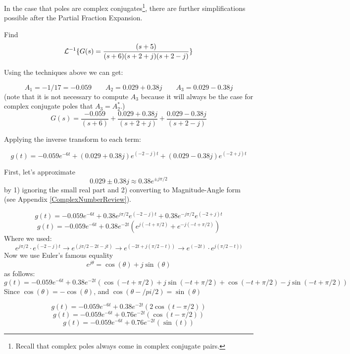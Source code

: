 In the case that poles are complex conjugates\footnote{Recall that complex poles always come in complex conjugate pairs.}, there are further simplifications possible after the Partial Fraction Expansion.




\begin{Example}

Find
\[
\mathcal{L}^{-1}\{G(s) = \frac{(s+5)}{(s+6)(s+2+j)(s+2-j)}\}
\]

\vspace{0.25in}

Using the techniques above we can get:

\[
A_1 = -1/17 = -0.059 \qquad A_2 = 0.029+0.38j \qquad A_3 = 0.029-0.38j
\]
(note that it is not necessary to compute $A_3$ because it will always be the case for complex conjugate poles that $A_3 = A_2^*$.)
\[
G(s)  = \frac {-0.059} {(s+6)}  + \frac {0.029+0.38j} {(s+2+j)}  + \frac {0.029-0.38j} {(s+2-j)}
\]

Applying the inverse transform to each term:

\[
g(t) = -0.059e^{-6t} + (0.029+0.38j)e^{(-2-j)t}+ (0.029-0.38j)e^{(-2+j)t}
\]

First, let's approximate
\[
0.029\pm 0.38j \approx 0.38e^{\pm j \pi/2}
\]
by 1) ignoring the small real part and 
2) converting to Magnitude-Angle form (see Appendix \ref{ComplexNumberReview}).

\[
g(t) = -0.059e^{-6t} + 0.38e^{j\pi/2}e^{(-2-j)t} + 0.38e^{-j\pi/2}e^{(-2+j)t}
\]
\[
g(t) = -0.059e^{-6t} + 0.38e^{-2t} \left ( e^{j(-t+\pi/2)}+e^{-j(-t+\pi/2)} \right )
\]
Where we used:  
\[
e^{j\pi/2}\cdot e^{(-2-j)t} \to e^{(j\pi/2-2t-jt)} \to e^{(-2t+j(\pi/2-t))} \to  e^{(-2t)}\cdot e^{j(\pi/2-t))}
\]
Now we use Euler's famous equality
\[
e^{j\theta} = \cos(\theta) + j \sin(\theta)
\]
as follows:
\[
g(t) = -0.059e^{-6t} + 0.38e^{-2t} \left (
    \cos(-t+\pi/2) + j\sin(-t+\pi/2)+
    \cos(-t+\pi/2) - j\sin(-t+\pi/2)
    \right )
\]
Since $\cos(\theta) = -\cos(\theta)$, and $\cos(\theta-/pi/2) = \sin(\theta)$

\[
g(t) = -0.059e^{-6t} + 0.38e^{-2t} \left (
    2\cos(t-\pi/2)
    \right )
\]
\[
g(t) = -0.059e^{-6t} + 0.76e^{-2t} \left (
    \cos(t-\pi/2)
    \right )
\]
\[
g(t) = -0.059e^{-6t} + 0.76e^{-2t} \left (  \sin(t)  \right )
\]

\end{Example}



